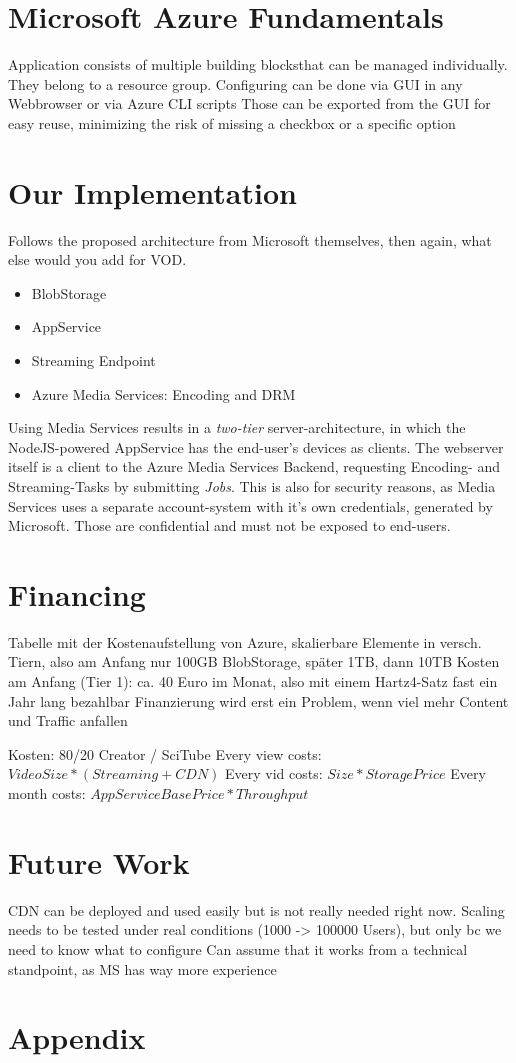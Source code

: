 \documentclass[english]{lni}
\begin{document}
\section{Microsoft Azure Fundamentals}
Application consists of multiple \glqq building blocks\grqq that can be managed individually.
They belong to a resource group.
Configuring can be done via GUI in any Webbrowser or via Azure CLI scripts
Those can be exported from the GUI for easy reuse, minimizing the risk of missing a checkbox or a specific option

\section{Our Implementation}
Follows the proposed architecture from Microsoft themselves, then again, what else would you add for VOD.
\begin{itemize}
    \item BlobStorage
    \item AppService
    \item Streaming Endpoint
    \item Azure Media Services: Encoding and DRM
\end{itemize}

Using Media Services results in a \textit{two-tier} server-architecture, in which the NodeJS-powered AppService has the end-user's devices
as clients. The webserver itself is a client to the Azure Media Services Backend, requesting Encoding- and Streaming-Tasks by
submitting \textit{Jobs}. This is also for security reasons, as Media Services uses a separate account-system with it's own credentials, 
generated by Microsoft.
Those are confidential and must not be exposed to end-users.

\section{Financing}
Tabelle mit der Kostenaufstellung von Azure, skalierbare Elemente
in versch. Tiern, also am Anfang nur 100GB BlobStorage, später 1TB, dann 10TB
Kosten am Anfang (Tier 1): ca. 40 Euro im Monat, also mit einem Hartz4-Satz fast ein Jahr lang bezahlbar
Finanzierung wird erst ein Problem, wenn viel mehr Content und Traffic anfallen

Kosten: 80/20 Creator / SciTube
Every view costs: $VideoSize * (Streaming+CDN)$
Every vid costs: $Size * StoragePrice$
Every month costs: $AppServiceBasePrice * Throughput$

\section{Future Work}
CDN can be deployed and used easily but is not really needed right now. 
Scaling needs to be tested under real conditions (1000 -> 100000 Users), but only bc we need to know what to configure
Can assume that it works from a technical standpoint, as MS has way more experience
    
\newpage
\section{Appendix}


\end{document}
